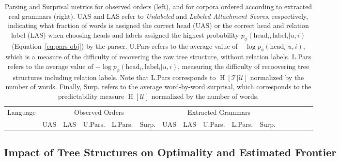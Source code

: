 \documentclass[10pt,twoside,lineno]{article}
\newcommand{\utterance}{\mathcal{U}}
\newcommand{\tree}{\mathcal{T}}
\begin{document}
\begin{table}
\centering
\small{
\begin{tabular}{l||ll|ll|l||ll|ll|l|lllll}
	Language & \multicolumn{5}{c||}{Observed Orders} & \multicolumn{5}{c|}{Extracted Grammars} \\ 
	& UAS & LAS & U.Pars. & L.Pars. & Surp. & UAS & LAS & U.Pars. & L.Pars. & Surp.\\ \hline \hline

\end{tabular}
}
	\caption{Parsing and Surprisal metrics for observed orders (left), and for corpora ordered according to extracted real grammars (right). UAS and LAS refer to \emph{Unlabeled} and \emph{Labeled Attachment Scores}, respectively, indicating what fraction of words is assigned the correct head (UAS) or the correct head and relation label (LAS) when choosing heads and labels assigned the highest probability $p_\phi(\text{head}_i, \text{label}_i | u, i)$ (Equation~\ref{eq:pars-obj}) by the parser.
	U.Pars refers to the average value of $- \log p_\phi(\text{head}_i| u, i)$, which is a measure of the difficulty of recovering the raw tree structure, without relation labels. 
	L.Pars refers to the average value of $- \log p_\phi(\text{head}_i, \text{label}_i| u, i)$, measuring the difficulty of recoovering tree structures including relation labels.
	Note that L.Pars corresponds to $\operatorname{H}[\tree|\utterance]$ normalized by the number of words.
	Finally, Surp. refers to the average word-by-word surprisal, which corresponds to the predictability measure $\operatorname{H}[\utterance]$ normalized by the number of words.
	}\label{tab:observed-and-extracted}
\end{table}


\subsection{Impact of Tree Structures on Optimality and Estimated Frontier}
\end{document}
